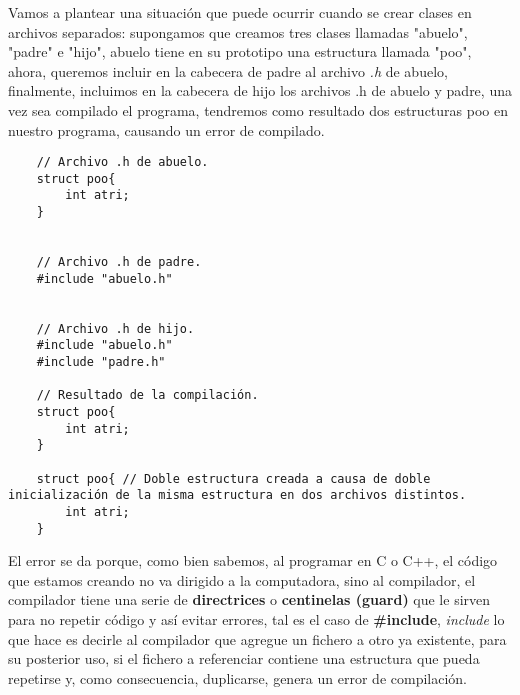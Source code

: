 Vamos a plantear una situación que puede ocurrir cuando se crear clases en archivos separados: supongamos que creamos tres clases llamadas "abuelo", "padre" e "hijo", abuelo tiene en su prototipo una estructura llamada "poo", ahora, queremos incluir en la cabecera de padre al archivo \textit{.h} de abuelo, finalmente, incluimos en la cabecera de hijo los archivos .h de abuelo y padre, una vez sea compilado el programa, tendremos como resultado dos estructuras poo en nuestro programa, causando un error de compilado.
\begin{lstlisting}
    // Archivo .h de abuelo.
    struct poo{
        int atri;
    }

    
    // Archivo .h de padre.
    #include "abuelo.h"

    
    // Archivo .h de hijo.
    #include "abuelo.h"
    #include "padre.h"
    
    // Resultado de la compilación.
    struct poo{
        int atri;
    }
    
    struct poo{ // Doble estructura creada a causa de doble inicialización de la misma estructura en dos archivos distintos.
        int atri;
    }
\end{lstlisting}

El error se da porque, como bien sabemos, al programar en C o C++, el código que estamos creando no va dirigido a la computadora, sino al compilador, el compilador tiene una serie de \textbf{directrices} o \textbf{centinelas (guard)} que le sirven para no repetir código y así evitar errores, tal es el caso de \textbf{\#include}, \textit{include} lo que hace es decirle al compilador que agregue un fichero a otro ya existente, para su posterior uso, si el fichero a referenciar contiene una estructura que pueda repetirse y, como consecuencia, duplicarse, genera un error de compilación.

